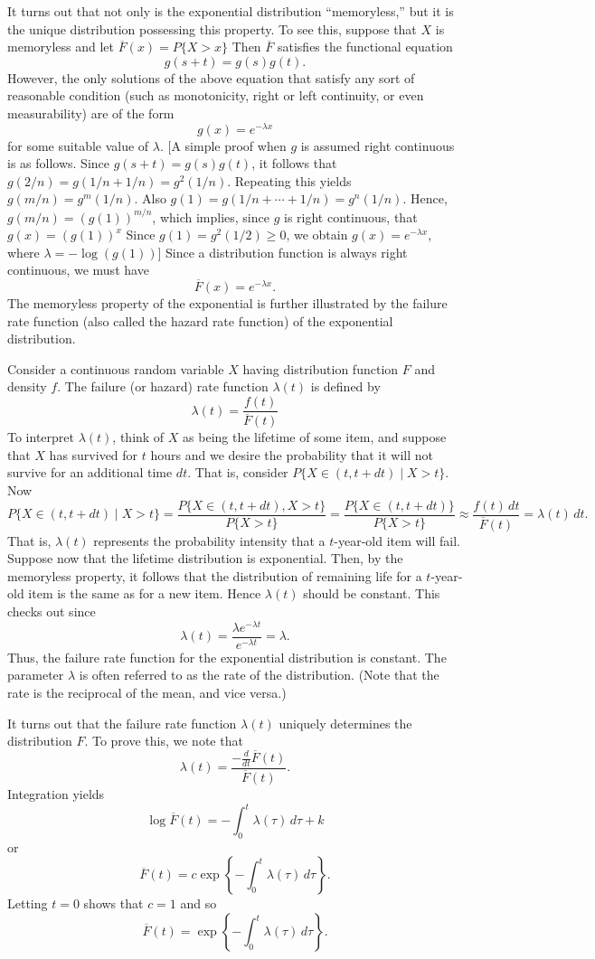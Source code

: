 \documentclass[lang=cn,10pt]{elegantbook}
\begin{document}
\begin{example}
It turns out that not only is the exponential distribution ``memoryless,'' but it is the unique distribution possessing this property. To see this, suppose that $X$ is memoryless and let $\overline{F}(x) = P\{X > x\}$ Then $\overline{F}$ satisfies the functional equation
\[
g(s + t) = g(s)g(t).
\]
However, the only solutions of the above equation that satisfy any sort of reasonable condition (such as monotonicity, right or left continuity, or even measurability) are of the form
\[
g(x) = e^{-\lambda x}
\]
for some suitable value of $\lambda$. [A simple proof when $g$ is assumed right continuous is as follows. Since $g(s + t) = g(s)g(t)$, it follows that $g(2/n) = g(1/n + 1/n) = g^2(1/n)$. Repeating this yields $g(m/n) = g^m(1/n)$. Also $g(1) = g(1/n + \cdots + 1/n) = g^n(1/n)$. Hence, $g(m/n) = (g(1))^{m/n}$, which implies, since $g$ is right continuous, that $g(x) = (g(1))^x$ Since $g(1) = g^2(1/2) \geq 0$, we obtain $g(x) = e^{-\lambda x}$, where $\lambda = -\log(g(1))$] Since a distribution function is always right continuous, we must have
\[
\overline{F}(x) = e^{-\lambda x}.
\]
The memoryless property of the exponential is further illustrated by the failure rate function (also called the hazard rate function) of the exponential distribution.

Consider a continuous random variable $X$ having distribution function $F$ and density $f$. The failure (or hazard) rate function $\lambda(t)$ is defined by
\begin{equation}
\lambda(t) = \frac{f(t)}{\overline{F}(t)} \tag{1.6.3}
\end{equation}
To interpret $\lambda(t)$, think of $X$ as being the lifetime of some item, and suppose that $X$ has survived for $t$ hours and we desire the probability that it will not survive for an additional time $dt$. That is, consider $P\{X \in (t, t + dt) \mid X > t\}$. Now
\[
P\{X \in (t, t + dt) \mid X > t\} = \frac{P\{X \in (t, t + dt), X > t\}}{P\{X > t\}} = \frac{P\{X \in (t, t + dt)\}}{P\{X > t\}} \approx \frac{f(t) \, dt}{\overline{F}(t)} = \lambda(t) \, dt.
\]
That is, $\lambda(t)$ represents the probability intensity that a $t$-year-old item will fail. Suppose now that the lifetime distribution is exponential. Then, by the memoryless property, it follows that the distribution of remaining life for a $t$-year-old item is the same as for a new item. Hence $\lambda(t)$ should be constant. This checks out since
\[
\lambda(t) = \frac{\lambda e^{-\lambda t}}{e^{-\lambda t}} = \lambda.
\]
Thus, the failure rate function for the exponential distribution is constant. The parameter $\lambda$ is often referred to as the rate of the distribution. (Note that the rate is the reciprocal of the mean, and vice versa.)

It turns out that the failure rate function $\lambda(t)$ uniquely determines the distribution $F$. To prove this, we note that
\[
\lambda(t) = \frac{-\frac{d}{dt} \overline{F}(t)}{\overline{F}(t)}.
\]
Integration yields
\[
\log \overline{F}(t) = -\int_{0}^{t} \lambda(\tau) \, d\tau + k
\]
or
\[
\overline{F}(t) = c \exp \left\{ -\int_{0}^{t} \lambda(\tau) \, d\tau \right\}.
\]
Letting $t = 0$ shows that $c = 1$ and so
\[
\overline{F}(t) = \exp \left\{ -\int_{0}^{t} \lambda(\tau) \, d\tau \right\}.
\]
\end{example}
\end{document}
